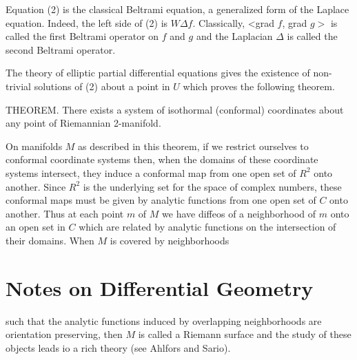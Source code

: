 \documentclass[10pt]{article}
\begin{document}
Equation (2) is the classical Beltrami equation, a generalized form of the Laplace equation. Indeed, the left side of (2) is $W \Delta f$. Classically, <grad $f$, grad $g>$ is called the first Beltrami operator on $f$ and $g$ and the Laplacian $\Delta$ is called the second Beltrami operator.

The theory of elliptic partial differential equations gives the existence of non-trivial solutions of (2) about a point in $U$ which proves the following theorem.

THEOREM. There exists a system of isothormal (conformal) coordinates about any point of Riemannian 2-manifold.

On manifolds $M$ as described in this theorem, if we restrict ourselves to conformal coordinate systems then, when the domains of these coordinate systems intersect, they induce a conformal map from one open set of $R^{2}$ onto another. Since $R^{2}$ is the underlying set for the space of complex numbers, these conformal maps must be given by analytic functions from one open set of $C$ onto another. Thus at each point $m$ of $M$ we have diffeos of a neighborhood of $m$ onto an open set in $C$ which are related by analytic functions on the intersection of their domains. When $M$ is covered by neighborhoods

\section{Notes on Differential Geometry}
such that the analytic functions induced by overlapping neighborhoods are orientation preserving, then $M$ is called a Riemann surface and the study of these objects leads io a rich theory (see Ahlfors and Sario).
\end{document}
